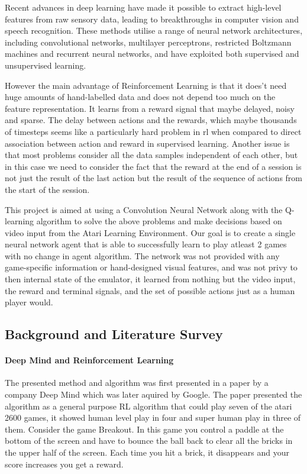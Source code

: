 \documentclass[a4paper,11pt]{article}
\begin{document}
			Recent advances in deep learning have made it possible to extract high-level features from raw sensory data, leading to breakthroughs in computer vision and speech recognition. These methods utilise a range of neural network architectures, including convolutional networks, multilayer perceptrons, restricted Boltzmann machines and recurrent neural networks, and have exploited both supervised and unsupervised learning.
	
			However the main advantage of Reinforcement Learning is that it does't need huge amounts of hand-labelled data and does not depend too much on the feature representation. It learns from a reward signal that maybe delayed, noisy and sparse. The delay between actions and the rewards, which maybe thousands of timesteps seems like a particularly hard problem in \ac{rl} when compared to direct association between action and reward in supervised learning. Another issue is that most problems consider all the data samples independent of each other, but in this case we need to consider the fact that the reward at the end of a session is not just the result of the last action but the result of the sequence of actions from the start of the session.

			This project is aimed at using a Convolution Neural Network along with the Q-learning algorithm to solve the above problems and make decisions based on video input from the Atari Learning Environment. Our goal is to create a single neural network agent that is able to successfully learn to play atleast 2 games with no change in agent algorithm. The network was not provided with any game-specific information or hand-designed visual features, and was not privy to then internal state of the emulator, it learned from nothing but the video input, the reward and terminal signals, and the set of possible actions just as a human player would.

		\subsection{Background and Literature Survey}
			\paragraph{Deep Mind and Reinforcement Learning}

				The presented method and algorithm was first presented in a paper by a company Deep Mind which was later aquired by Google. The paper presented the algorithm as a general purpose RL algorithm that could play seven of the atari 2600 games, it showed human level play in four and super human play in three of them.
				Consider the game Breakout. In this game you control a paddle at the bottom of the screen and have to bounce the ball back to clear all the bricks in the upper half of the screen. Each time you hit a brick, it disappears and your score increases you get a reward.
\end{document}
